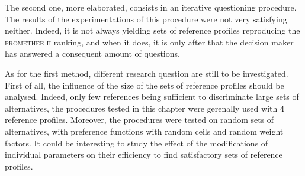 The second one, more elaborated, consists in an iterative questioning procedure.
The results of the experimentations of this procedure were not very satisfying neither. 
Indeed, it is not always yielding sets of reference profiles reproducing the \textsc{promethee ii} ranking, and when it does, it is only after that the decision maker has answered a consequent amount of questions.

As for the first method, different research question are still to be investigated. 
First of all, the influence of the size of the sets of reference profiles should be analysed. Indeed, only few references being sufficient to discriminate large sets of alternatives, the procedures tested in this chapter were gerenally used with 4 reference profiles.
Moreover, the procedures were tested on random sets of alternatives, with preference functions with random ceils and random weight factors. It could be interesting to study the effect of the modifications of individual parameters on their efficiency to find satisfactory sets of reference profiles.
